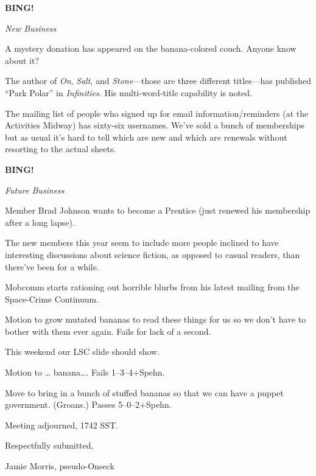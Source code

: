 \documentclass[12pt]{article}
\newcommand{\bing}{{\bf BING!} }
\newcommand{\goto}[1]{\bing \vskip 12pt \centerline{{\em{#1}}}}
\begin{document}
\goto{New Business}

A mystery donation has appeared on the banana-colored couch.
Anyone know about it?

The author of \emph{On}, \emph{Salt}, and \emph{Stone}---those are three
different titles---has published ``Park Polar'' in \emph{Infinities}.
His multi-word-title capability is noted.

The mailing list of people who signed up for email information/reminders
(at the Activities Midway) has sixty-six usernames.  We've sold a bunch of
memberships but as usual it's hard to tell which are new and which are
renewals without resorting to the actual sheets.

\goto{Future Business}

Member Brad Johnson wants to become a Prentice (just renewed his membership
after a long lapse).

The new members this year seem to include more people inclined to have
interesting discussions about science fiction, as opposed to casual readers,
than there've been for a while.

Mobcomm starts rationing out horrible blurbs from his latest mailing
from the Space-Crime Continuum.

Motion to grow mutated bananas to read these things for us so we don't
have to bother with them ever again.  Fails for lack of a second.

This weekend our LSC slide should show.

Motion to \ldots{} banana\ldots{}.  Fails 1--3--4+Spehn.

Move to bring in a bunch of stuffed bananas so that we can
have a puppet government.  (Groans.)  Passes 5--0--2+Spehn.

\vspace{12pt}

\noindent
Meeting adjourned, 1742 SST.

\vspace{18pt}

\centerline{Respectfully submitted,}
\centerline{Jamie Morris, pseudo-Onseck}
\end{document}
